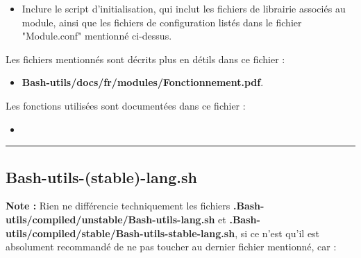 \documentclass[a4paper,10pt]{article}
\begin{document}
\begin{justify}
    \begin{itemize}
        \item Inclure le script d'initialisation, qui inclut les fichiers de librairie associés au module, ainsi que les fichiers de configuration listés dans le fichier "Module.conf" mentionné ci-dessus.
    \end{itemize}
\end{justify}

\begin{justify}
    Les fichiers mentionnés sont décrits plus en détils dans ce fichier :

    \begin{itemize}
        \item \textbf{\color{lime}Bash-utils/docs/fr/modules/Fonctionnement.pdf}.
    \end{itemize}
\end{justify}

\begin{justify}
    Les fonctions utilisées sont documentées dans ce fichier :

    \begin{itemize}
        \item \textbf{\color{lime}}
    \end{itemize}

\end{justify}




\color{green}\par\noindent\rule{\textwidth}{0.4pt}\color{white}

\color{green}
\subsection{\color{lime}Bash-utils-(stable)-lang.sh}\color{white}

\begin{justify}
    \textbf{Note :} Rien ne différencie techniquement les fichiers \textbf{\color{lime}.Bash-utils/compiled/unstable/Bash-utils-lang.sh} et \textbf{\color{lime}.Bash-utils/compiled/stable/Bash-utils-stable-lang.sh}, si ce n'est qu'il est absolument recommandé de ne pas toucher au dernier fichier mentionné, car :
\end{justify}
\end{document}
